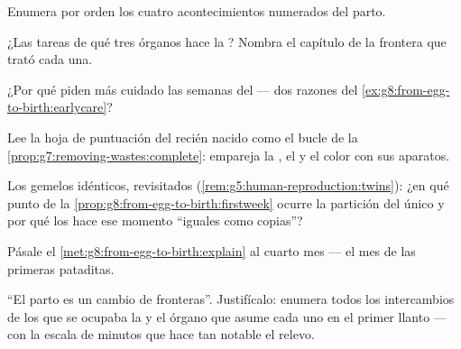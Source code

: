 \begin{exercise}[$\star$]\label{exo:g8:from-egg-to-birth:6}
Enumera por orden los cuatro acontecimientos numerados del parto.
\end{exercise}

\begin{exercise}[$\star\star$]\label{exo:g8:from-egg-to-birth:7}
¿Las tareas de qué tres órganos hace la ? Nombra el capítulo de
la frontera que trató cada una.
\end{exercise}

\begin{exercise}[$\star\star$]\label{exo:g8:from-egg-to-birth:8}
¿Por qué piden más cuidado las semanas del  --- dos razones del
\cref{ex:g8:from-egg-to-birth:earlycare}?
\end{exercise}

\begin{exercise}[$\star\star$]\label{exo:g8:from-egg-to-birth:9}
Lee la hoja de puntuación del recién nacido como el bucle de la
\cref{prop:g7:removing-wastes:complete}: empareja la , el
 y el color con sus aparatos.
\end{exercise}

\begin{exercise}[$\star\star$]\label{exo:g8:from-egg-to-birth:10}
Los gemelos idénticos, revisitados
(\cref{rem:g5:human-reproduction:twins}): ¿en qué punto de la
\cref{prop:g8:from-egg-to-birth:firstweek} ocurre la partición del
único  y por qué los hace ese momento ``iguales como copias''?
\end{exercise}

\begin{exercise}[$\star\star$]\label{exo:g8:from-egg-to-birth:11}
Pásale el \cref{met:g8:from-egg-to-birth:explain} al cuarto mes --- el
mes de las primeras pataditas.
\end{exercise}

\begin{exercise}[$\star\star\star$]\label{exo:g8:from-egg-to-birth:12}
``El parto es un cambio de fronteras''. Justifícalo: enumera todos los
intercambios de los que se ocupaba la  y el órgano que asume
cada uno en el primer llanto --- con la escala de minutos que hace tan
notable el relevo.
\end{exercise}

